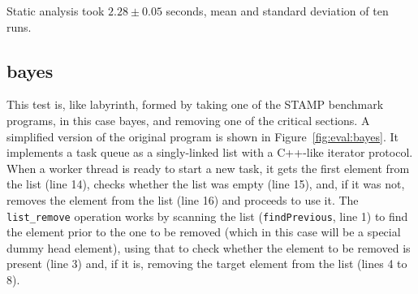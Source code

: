 
Static analysis took $2.28 \pm 0.05$ seconds, mean and standard
deviation of ten runs.

\subsection{bayes}

This test is, like labyrinth, formed by taking one of the STAMP
benchmark programs, in this case bayes, and removing one of the
critical sections.  A simplified version of the original program is
shown in Figure~\ref{fig:eval:bayes}.  It implements a task queue as a
singly-linked list with a C++-like iterator protocol\needCite{}.  When
a worker thread is ready to start a new task, it gets the first
element from the list (line 14), checks whether the list was empty
(line 15), and, if it was not, removes the element from the list (line
16) and proceeds to use it.  The \texttt{list\_remove} operation works
by scanning the list (\texttt{findPrevious}, line 1) to find the
element prior to the one to be removed (which in this case will be a
special dummy head element), using that to check whether the element
to be removed is present (line 3) and, if it is, removing the target
element from the list (lines 4 to 8).

